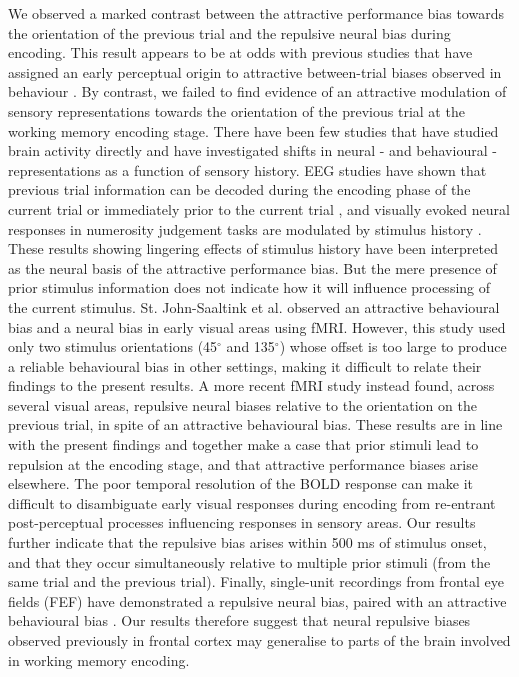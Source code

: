 \documentclass{article}
\begin{document}
\begin{large}
We observed a marked contrast between the attractive performance bias towards the orientation of the previous trial and the repulsive neural bias during encoding. This result appears to be at odds with previous studies that have assigned an early perceptual origin to attractive between-trial biases observed in behaviour \parencite[e.g., ][]{Fischer2014, Cicchini2017, Cicchini2018}. By contrast, we failed to find evidence of an attractive modulation of sensory representations towards the orientation of the previous trial at the working memory encoding stage. There have been few studies that have studied brain activity directly and have investigated shifts in neural - and behavioural - representations as a function of sensory history. EEG studies have shown that previous trial information can be decoded during the encoding phase of the current trial \parencite{Bae2019} or immediately prior to the current trial \parencite{Barbosa2020}, and visually evoked neural responses in numerosity judgement tasks are modulated by stimulus history \parencite{Fornaciai2018, Fornaciai2019}. These results showing lingering effects of stimulus history have been interpreted as the neural basis of the attractive performance bias. But the mere presence of prior stimulus information does not indicate how it will influence processing of the current stimulus. St. John-Saaltink et al. \citeyear{StJohn-Saaltink2016} observed an attractive behavioural bias and a neural bias in early visual areas using fMRI. However, this study used only two stimulus orientations (45$^{\circ}$ and 135$^{\circ}$) whose offset is too large to produce a reliable behavioural bias in other settings, making it difficult to relate their findings to the present results. A more recent fMRI study \parencite{Sheehan2021} instead found, across several visual areas, repulsive neural biases relative to the orientation on the previous trial, in spite of an attractive behavioural bias. These results are in line with the present findings and together make a case that prior stimuli lead to repulsion at the encoding stage, and that attractive performance biases arise elsewhere. The poor temporal resolution of the BOLD response can make it difficult to disambiguate early visual responses during encoding from re-entrant post-perceptual processes influencing responses in sensory areas. Our results further indicate that the repulsive bias arises within 500 ms of stimulus onset, and that they occur simultaneously relative to multiple prior stimuli (from the same trial and the previous trial). Finally, single-unit recordings from frontal eye fields (FEF) have demonstrated a repulsive neural bias, paired with an attractive behavioural bias \parencite{Papadimitriou2017}. Our results therefore suggest that neural repulsive biases observed previously in frontal cortex may generalise to parts of the brain involved in working memory encoding.


\end{large}
\end{document}
